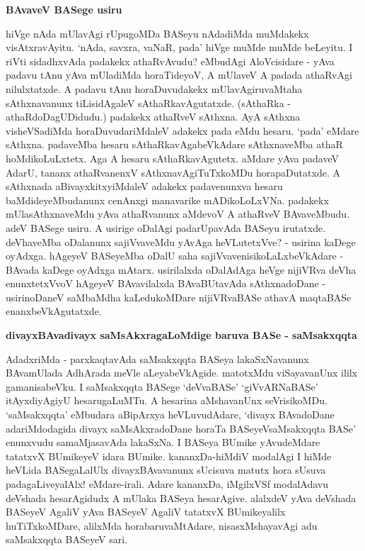 {\bigskip
\noindent
{\large\bf BAvaveV BASege usiru}}\label{page9}
\medskip

\noindent
hiVge nAda mUlavAgi rUpugoMDa BASeyu nAdadiMda muMdakekx visAtxravAyitu. `nAda, savxra, vaNaR, pada' hiVge muMde muMde beLeyitu. I riVti sidadhxvAda padakekx athaRvAvudu? eMbu\-dAgi AloVcisidare - yAva padavu tAnu yAva mUladiMda horaTideyoV, A mUlaveV A padada athaRvAgi nilulxtatxde. A padavu tAnu horaDuvudakekx mUlavAgiruvaMtaha sAthxnavanunx tiLisi\-dAgaleV sAthaRkavAgutatxde. (sAthaRka - athaRdoDagUDidudu.) padakekx athaRveV sAthxna. AyA sAthxna visheVSa\-diMda horaDuvudariMdaleV adakekx pada eMdu hesaru. `pada' eMdare sAthxna. pada\-veMba hesaru sAthaRkavAgabeVkAdare sAthxnaveMba athaR hoMdikoLuLxtetx. Aga A hesaru sAthaRkavAgutetx. aMdare yAva padaveV AdarU, tananx athaRvanenxV sAthxnavAgiTuTxkoMDu horapaDutatxde. A sAthxnada aBivayxkitx\-yiMdaleV adakekx padavenunxva hesaru baMdideyeMbudanunx cenAnxgi manavarike mADikoLoLxVNa. padakekx mUlasAthxnaveMdu yAva athaRvanunx aMdevoV A athaRveV BAvaveMbudu. adeV BASege usiru. A usirige oDalAgi padarUpavAda BASeyu irutatxde. deVha\-veMba oDa\-lanunx sajiVva\-veMdu yAvAga\- heVLutetxVve? - usirina kaDege oyAdxga. hAgeyeV BASeyeMba oDalU saha sajiVva\-venisi\-koLaLxbeVkAdare - BAvada kaDege oyAdxga mAtarx. usirilalxda oDalAdAga heVge nijiVRva deVha enunx\-tetxVvoV hAgeyeV BAvavilalxda BAvaBUtavAda sAthxnadoDane - usirinoDaneV saMbaMdha kaLedu\-koMDare nijiVRvaBASe athavA maqtaBASe enanxbeVkAgutatxde.

{\bigskip
\noindent
{\large\bf divayxBAvadivayx saMsAkxragaLoMdige baruva BASe - saMsakxqqta}}\label{page10}
\medskip

\noindent
AdadxriMda - parxkaqtavAda saMsakxqqta BASeya lakaSxNavanunx BAvamUlada AdhArada meVle aLeya\-beVkAgide. matotxMdu viSayavanUnx ililx gamanisabeVku. I \hbox{saMsakxqqta} BASege `deVvaBASe' `giVvARNa\-BASe' itAyxdi\-yAgiyU hesarugaLuMTu. A hesarina aMshavanUnx seVrisikoMDu. `saMsakxqqta' eMbu\-dara aBi\-pArxya heVLuvudAdare, `divayx BAvadoDane adariMdodagida divayx saMsAkxradoDane horaTa BASeyeV\-saMsakxqqta BASe' enunxvudu samaMjasavAda lakaSxNa. I BASeya BUmike yAvudeMdare tatatxvX BUmikeyeV idara BUmike. kananxDa-hiMdiV modalAgi I hiMde heVLida BASegaLalUlx divayxBAva\-vanunx sUci\-suva matutx hora sUsuva padagaLive\-yalAlx! eMdare-irali. Adare kananxDa, iMgilxVSf modalAdavu deVshada\- hesarAgidudx A mUlaka BASeya hesarAgive. alalxdeV yAva deVshada BASeyeV AgaliV yAva BASeyeV AgaliV tatatxvX BUmikeyalilx huTiTxkoMDare, alilxMda horabaruvaMtA\-dare, nisasxMshaya\-vAgi adu saMsakxqqta BASeyeV sari.

